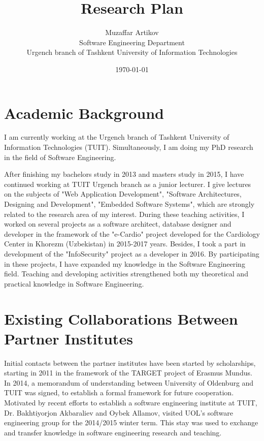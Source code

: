 \documentclass[10pt, oneside]{article}
\title{Research Plan}
\author{Muzaffar Artikov\\
Software Engineering Department\\
Urgench branch of Tashkent University of Information Technologies}
\date{\today}
\begin{document}
\maketitle

\section{Academic Background}
I am currently working at the Urgench branch of Tashkent University of Information Technologies (TUIT). Simultaneously, I am doing my PhD research in the field of Software Engineering. 

After finishing my bachelors study in 2013 and masters study in 2015, I have continued working at TUIT Urgench branch as a junior lecturer. I give lectures on the subjects of "Web Application Development", "Software Architectures, Designing and Development", "Embedded Software Systems", which are strongly related to the research area of my interest. During these teaching activities, I worked on several projects as a software architect, database designer and developer in the framework of the "e-Cardio" project developed for the Cardiology Center in Khorezm (Uzbekistan) in 2015-2017 years. Besides, I took a part in development of the "InfoSecurity" project as a developer in 2016. By participating in these projects, I have expanded my knowledge in the Software Engineering field. Teaching and developing activities strengthened both my theoretical and practical knowledge in Software Engineering.

\section{Existing Collaborations Between Partner Institutes}
Initial contacts between the partner institutes have been started by scholarships, starting in 2011 in the framework of the TARGET project of Erasmus Mundus. In 2014, a memorandum of understanding between University of Oldenburg and TUIT was signed, to establish a formal framework for future cooperation. Motivated by recent efforts to establish a software engineering institute at TUIT, Dr. Bakhtiyorjon Akbaraliev and Oybek Allamov, visited UOL’s software engineering group for the 2014/2015 winter term. This stay was used to exchange and transfer knowledge in software engineering research and teaching.
\end{document}
